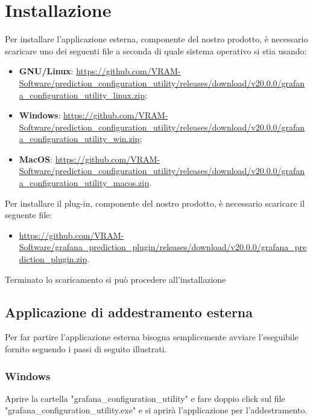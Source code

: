 \section{Installazione}
Per installare l'applicazione esterna, componente del nostro prodotto\glo, è necessario scaricare uno dei seguenti file a seconda di quale sistema operativo si stia usando:
\begin{itemize}
	\item \textbf{GNU/Linux}: \url{https://github.com/VRAM-Software/prediction_configuration_utility/releases/download/v20.0.0/grafana_configuration_utility_linux.zip};
	\item \textbf{Windows}: \url{https://github.com/VRAM-Software/prediction_configuration_utility/releases/download/v20.0.0/grafana_configuration_utility_win.zip};
	\item \textbf{MacOS}: \url{https://github.com/VRAM-Software/prediction_configuration_utility/releases/download/v20.0.0/grafana_configuration_utility_macos.zip}.
\end{itemize}
Per installare il plug-in, componente del nostro prodotto\glo, è necessario scaricare il seguente file:
\begin{itemize}
	\item \url{https://github.com/VRAM-Software/grafana_prediction_plugin/releases/download/v20.0.0/grafana_prediction_plugin.zip}.
\end{itemize}
Terminato lo scaricamento si può procedere all'installazione

\subsection{Applicazione di addestramento esterna}
Per far partire l'applicazione esterna bisogna semplicemente avviare l'eseguibile fornito seguendo i passi di seguito illustrati.
	\subsubsection{Windows}
	Aprire la cartella "grafana\_configuration\_utility" e fare doppio click sul file "grafana\_configuration\_utility.exe" e si aprirà l'applicazione per l'addestramento.


